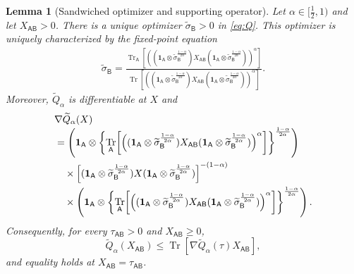 \documentclass[11pt,reqno]{amsart}
\newtheorem{lemma}[lemma]{Lemma}
\theoremstyle{definition}
\DeclareMathOperator{\Tr}{Tr}
\newcommand{\I}{\mathbf 1}
\newcommand{\A}{\mathsf{A}}
\newcommand{\B}{\mathsf{B}}
\newcommand{\sand}{\widetilde}
\begin{document}
\begin{lemma}[Sandwiched optimizer and supporting operator]
\label{lem:sand_supporting}
Let $\alpha\in[\frac12,1)$ and let $X_{\A\B}>0$.
There is a unique optimizer
$\sand\sigma_{\B}>0$ in \cref{eq:Q}.  
This optimizer is uniquely characterized by the fixed-point equation \cite{HT14, rubboli2026quantum}
\begin{align}
\sand\sigma_{\B}
=\frac{
\Tr_{\A}\!\left[\left(
(\I_{\A}\otimes\sand\sigma_{\B}^{\frac{1-\alpha}{2\alpha}})
X_{\A\B}
(\I_{\A}\otimes\sand\sigma_{\B}^{\frac{1-\alpha}{2\alpha}})
\right)^\alpha\right]}
{
\Tr\!\left[\left(
(\I_{\A}\otimes\sand\sigma_{\B}^{\frac{1-\alpha}{2\alpha}})
X_{\A\B}
(\I_{\A}\otimes\sand\sigma_{\B}^{\frac{1-\alpha}{2\alpha}})
\right)^\alpha\right]}.
\label{eq:fixed-point}
\end{align}
Moreover, $\sand Q_{\alpha}$ is differentiable at $X$ and
\begin{align}
&\nabla\sand Q_{\alpha}(X)
\notag\\[-1mm]
&=
\left(
\I_{\A}\otimes
\left\{
\Tr_{\A}\!\left[\left(
(\I_{\A}\otimes\sand\sigma_{\B}^{\frac{1-\alpha}{2\alpha}})
X_{\A\B}
(\I_{\A}\otimes\sand\sigma_{\B}^{\frac{1-\alpha}{2\alpha}})
\right)^\alpha\right]
\right\}^{\frac{1-\alpha}{2\alpha}}
\right)
\notag\\
&\quad\times
\left[
(\I_{\A}\otimes\sand\sigma_{\B}^{\frac{1-\alpha}{2\alpha}})
X
(\I_{\A}\otimes\sand\sigma_{\B}^{\frac{1-\alpha}{2\alpha}})
\right]^{-(1-\alpha)}
\notag\\
&\quad\times
\left(
\I_{\A}\otimes
\left\{
\Tr_{\A}\!\left[\left(
(\I_{\A}\otimes\sand\sigma_{\B}^{\frac{1-\alpha}{2\alpha}})
X_{\A\B}
(\I_{\A}\otimes\sand\sigma_{\B}^{\frac{1-\alpha}{2\alpha}})
\right)^\alpha\right]
\right\}^{\frac{1-\alpha}{2\alpha}}
\right).
\label{eq:gradient}
\end{align}
Consequently, for every $\tau_{\A\B}>0$ and $X_{\A\B}\geq0$,
\begin{equation}
 \sand Q_{\alpha}(X_{\A\B})
 \leq
 \Tr\!\left[\nabla\sand Q_{\alpha}(\tau)X_{\A\B}\right],
 \label{eq:sand-support}
\end{equation}
and equality holds at $X_{\A\B}=\tau_{\A\B}$.
\end{lemma}
\end{document}
